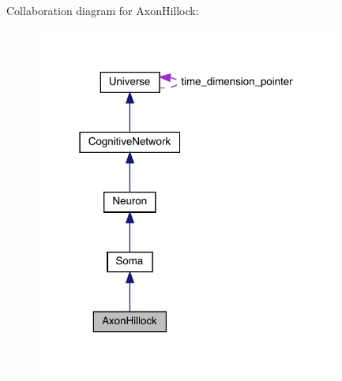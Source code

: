 Collaboration diagram for Axon\+Hillock\+:
\nopagebreak
\begin{figure}[H]
\begin{center}
\leavevmode
\includegraphics[width=283pt]{class_axon_hillock__coll__graph}
\end{center}
\end{figure}
